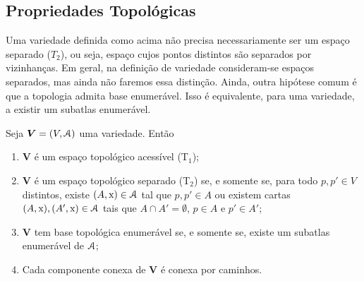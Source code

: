 \subsection{Propriedades Topológicas}

Uma variedade definida como acima não precisa necessariamente ser um espaço separado ($T_2$), ou seja, espaço cujos pontos distintos são separados por vizinhanças. Em geral, na definição de variedade consideram-se espaços separados, mas ainda não faremos essa distinção. Ainda, outra hipótese comum é que a topologia admita base enumerável. Isso é equivalente, para uma variedade, a existir um subatlas enumerável.

\begin{prop}
Seja $\bm V = (V,\mathcal{A})$ uma variedade. Então
	\begin{enumerate}
	\item $\bm V$ é um espaço topológico acessível (T$_1$);
	
	\item $\bm V$ é um espaço topológico separado (T$_2$) se, e somente se, para todo $p,p' \in V$ distintos, existe $(A,\mathrm{x}) \in \mathcal{A}$ tal que $p,p' \in A$ ou existem cartas $(A,\mathrm{x}), (A',\mathrm{x}) \in \mathcal{A}$ tais que $A \cap A' = \emptyset$, $p \in A$ e $p' \in A'$;
	
	\item $\bm V$ tem base topológica enumerável se, e somente se, existe um subatlas enumerável de $\mathcal{A}$;
	
	\item Cada componente conexa de $\bm V$ é conexa por caminhos.
	\end{enumerate}
\end{prop}
